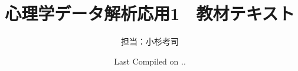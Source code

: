 \documentclass{ltjsbook}
\begin{document}
\VerbatimFootnotes
\title{心理学データ解析応用1　教材テキスト}
\author{担当：小杉考司}
\date{Last Compiled on \number\year .\number\month .\number\day}
\maketitle
\setcounter{tocdepth}{1}
\tableofcontents
\linenumbers















% 
% 
% 
% 
% 
% 
% 
% 
% 
% 
% 
% 
% 
% 
% 
\nolinenumbers


\printindex
\end{document}
